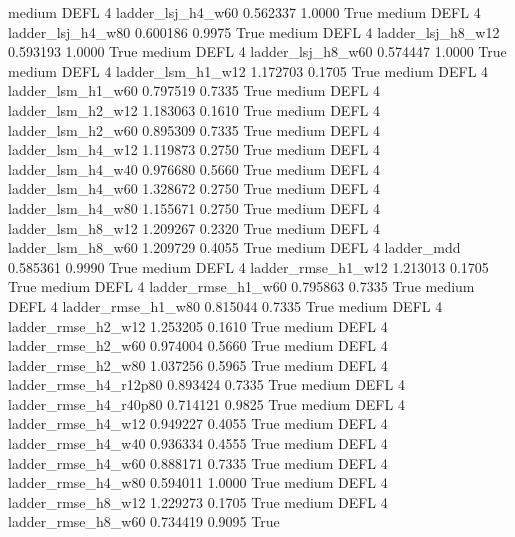     medium     DEFL                 4      ladder_lsj_h4_w60   0.562337      1.0000    True
    medium     DEFL                 4      ladder_lsj_h4_w80   0.600186      0.9975    True
    medium     DEFL                 4      ladder_lsj_h8_w12   0.593193      1.0000    True
    medium     DEFL                 4      ladder_lsj_h8_w60   0.574447      1.0000    True
    medium     DEFL                 4      ladder_lsm_h1_w12   1.172703      0.1705    True
    medium     DEFL                 4      ladder_lsm_h1_w60   0.797519      0.7335    True
    medium     DEFL                 4      ladder_lsm_h2_w12   1.183063      0.1610    True
    medium     DEFL                 4      ladder_lsm_h2_w60   0.895309      0.7335    True
    medium     DEFL                 4      ladder_lsm_h4_w12   1.119873      0.2750    True
    medium     DEFL                 4      ladder_lsm_h4_w40   0.976680      0.5660    True
    medium     DEFL                 4      ladder_lsm_h4_w60   1.328672      0.2750    True
    medium     DEFL                 4      ladder_lsm_h4_w80   1.155671      0.2750    True
    medium     DEFL                 4      ladder_lsm_h8_w12   1.209267      0.2320    True
    medium     DEFL                 4      ladder_lsm_h8_w60   1.209729      0.4055    True
    medium     DEFL                 4             ladder_mdd   0.585361      0.9990    True
    medium     DEFL                 4     ladder_rmse_h1_w12   1.213013      0.1705    True
    medium     DEFL                 4     ladder_rmse_h1_w60   0.795863      0.7335    True
    medium     DEFL                 4     ladder_rmse_h1_w80   0.815044      0.7335    True
    medium     DEFL                 4     ladder_rmse_h2_w12   1.253205      0.1610    True
    medium     DEFL                 4     ladder_rmse_h2_w60   0.974004      0.5660    True
    medium     DEFL                 4     ladder_rmse_h2_w80   1.037256      0.5965    True
    medium     DEFL                 4  ladder_rmse_h4_r12p80   0.893424      0.7335    True
    medium     DEFL                 4  ladder_rmse_h4_r40p80   0.714121      0.9825    True
    medium     DEFL                 4     ladder_rmse_h4_w12   0.949227      0.4055    True
    medium     DEFL                 4     ladder_rmse_h4_w40   0.936334      0.4555    True
    medium     DEFL                 4     ladder_rmse_h4_w60   0.888171      0.7335    True
    medium     DEFL                 4     ladder_rmse_h4_w80   0.594011      1.0000    True
    medium     DEFL                 4     ladder_rmse_h8_w12   1.229273      0.1705    True
    medium     DEFL                 4     ladder_rmse_h8_w60   0.734419      0.9095    True
